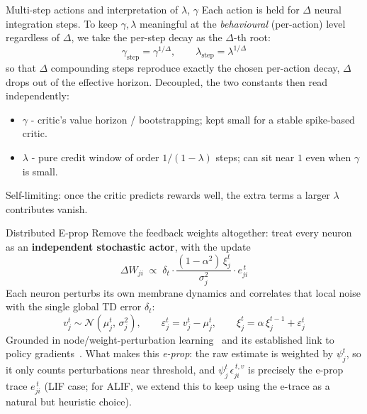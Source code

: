 \documentclass[aspectratio=169,11pt]{beamer}
\begin{document}
\begin{frame}{Multi-step actions and interpretation of $\lambda$, $\gamma$}
  Each action is held for $\Delta$ neural integration steps. To keep
  $\gamma,\lambda$ meaningful at the \emph{behavioural} (per-action) level
  regardless of $\Delta$, we take the per-step decay as the $\Delta$-th root:
  \[
    \gamma_{\text{step}} = \gamma^{1/\Delta}, \qquad
    \lambda_{\text{step}} = \lambda^{1/\Delta}
  \]
  so that $\Delta$ compounding steps reproduce exactly the chosen per-action
  decay, $\Delta$ drops out of the effective horizon. Decoupled, the two
  constants then read independently:
  \begin{itemize}\small
    \item $\gamma$ - critic's value horizon / bootstrapping; kept small for a
          stable spike-based critic.
    \item $\lambda$ - pure credit window of order $1/(1-\lambda)$ steps; can sit
          near $1$ even when $\gamma$ is small.
  \end{itemize}
  Self-limiting: once the critic predicts rewards well, the extra terms a larger
  $\lambda$ contributes vanish.
\end{frame}

\begin{frame}{Distributed E-prop}
  Remove the feedback weights altogether: treat every neuron as an
  \textbf{independent stochastic actor}, with the update
  \[
    \Delta W_{ji} \;\propto\;
      \delta_t \cdot \frac{(1-\alpha^2)\,\xi_j^t}{\sigma_j^2} \cdot e^{\,t}_{ji}
  \]
  Each neuron perturbs its own membrane dynamics and correlates that local
  noise with the single global TD error $\delta_t$:
  \[ v_j^t \sim \mathcal{N}(\mu_j^t,\, \sigma_j^2),
     \qquad \varepsilon_j^t = v_j^t - \mu_j^t,
     \qquad \xi_j^t = \alpha\,\xi_j^{t-1} + \varepsilon_j^t \]
  Grounded in node/weight-perturbation learning~\citep{Cauwenberghs1992}
  and its established link to policy
  gradients~\citep{Williams1992REINFORCE,fiete2006gradient}.
  \vfill
  \centering\small
  What makes this \emph{e-prop}: the raw estimate is weighted by
  $\psi_j^t$, so it only counts perturbations near threshold, and
  $\psi_j^t\,\epsilon^{\,t,v}_{ji}$ is precisely the e-prop trace
  $e^{\,t}_{ji}$ (LIF case; for ALIF, we extend this to keep using the
  e-trace as a natural but heuristic choice).
\end{frame}
\end{document}
